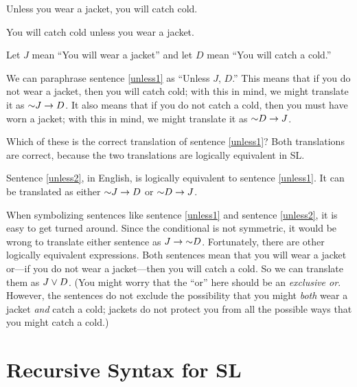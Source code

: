 \begin{earg}
\item[\ex{unless1}] Unless you wear a jacket, you will catch cold. 
\item[\ex{unless2}] You will catch cold unless you wear a jacket. 
\end{earg}

Let $J$ mean ``You will wear a jacket'' and let $D$ mean ``You will catch a cold.''

We can paraphrase sentence \ref{unless1} as ``Unless $J$, $D$.'' This means that if you do not wear a jacket, then you will catch cold; with this in mind, we might translate it as $\mathord{\sim} J \rightarrow D$. It also means that if you do not catch a cold, then you must have worn a jacket; with this in mind, we might translate it as $\mathord{\sim} D \rightarrow J$.

Which of these is the correct translation of sentence \ref{unless1}? Both translations are correct, because the two translations are logically equivalent in SL.

Sentence \ref{unless2}, in English, is logically equivalent to sentence \ref{unless1}. It can be translated as either $\mathord{\sim} J \rightarrow D$ or $\mathord{\sim} D \rightarrow J$.

When symbolizing sentences like sentence \ref{unless1} and sentence \ref{unless2}, it is easy to get turned around. Since the conditional is not symmetric, it would be wrong to translate either sentence as $J \rightarrow \mathord{\sim} D$. Fortunately, there are other logically equivalent expressions. Both sentences mean that you will wear a jacket or---if you do not wear a jacket---then you will catch a cold. So we can translate them as $J \vee D$. (You might worry that the ``or'' here should be an \emph{exclusive or}. However, the sentences do not exclude the possibility that you might \emph{both} wear a jacket \emph{and} catch a cold; jackets do not protect you from all the possible ways that you might catch a cold.)








\section{Recursive Syntax for SL} %

